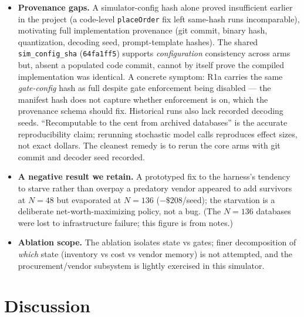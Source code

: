 \documentclass[11pt]{article}
\begin{document}
\begin{itemize}
failure is an immediate compound-decision/pricing omission, not gradual drift.
R1b is the arm that could substantiate a specifically long-horizon-memory
mechanism, but only if its state errors are shown to \emph{accumulate with
horizon}; we have not yet produced that evidence (e.g., state-reconstruction
error vs.\ day, or the full-vs-baseline advantage at 10/25/50/100/200-day
horizons). As it stands the paper establishes a scaffolding result on a
long-horizon task more firmly than it establishes a long-horizon-memory
\emph{mechanism}.
\item \textbf{Provenance gaps.} A simulator-config hash alone proved
insufficient earlier in the project (a code-level \texttt{placeOrder} fix left
same-hash runs incomparable), motivating full implementation provenance (git
commit, binary hash, quantization, decoding seed, prompt-template hashes). The
shared \texttt{sim\_config\_sha} (\texttt{64fa1ff5}) supports \emph{configuration}
consistency across arms but, absent a populated code commit, cannot by itself
prove the compiled implementation was identical. A concrete symptom: R1a carries
the same \emph{gate-config} hash as full despite gate enforcement being disabled
--- the manifest hash does not capture whether enforcement is on, which the
provenance schema should fix. Historical runs also lack recorded decoding seeds.
``Recomputable to the cent from archived databases'' is the accurate
reproducibility claim; rerunning stochastic model calls reproduces effect sizes,
not exact dollars. The cleanest remedy is to rerun the core arms with git commit
and decoder seed recorded.
\item \textbf{A negative result we retain.} A prototyped fix to the harness's
tendency to starve rather than overpay a predatory vendor appeared to add
survivors at $N=48$ but evaporated at $N=136$ ($-\$208$/seed); the starvation is
a deliberate net-worth-maximizing policy, not a bug. (The $N=136$ databases were
lost to infrastructure failure; this figure is from notes.)
\item \textbf{Ablation scope.} The ablation isolates state vs gates; finer
decomposition of \emph{which} state (inventory vs cost vs vendor memory) is not
attempted, and the procurement/vendor subsystem is lightly exercised in this
simulator.
\end{itemize}

\section{Discussion}
\end{document}
